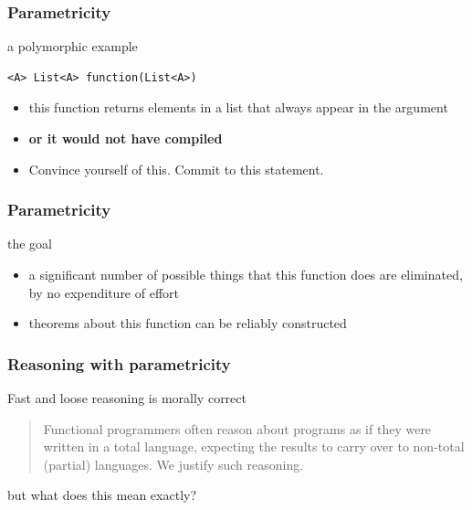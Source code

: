 \begin{frame}[fragile]
\frametitle{Parametricity}
\begin{block}{a polymorphic example}
\begin{lstlisting}
<A> List<A> function(List<A>)
\end{lstlisting}
\end{block}
\begin{itemize}
  \item<1-> this function returns elements in a list that always appear in the argument
  \item<1-> \textbf{or it would not have compiled}
  \item<2-> Convince yourself of this. Commit to this statement.
\end{itemize}
\end{frame}

\begin{frame}[fragile]
\frametitle{Parametricity}
\begin{block}{the goal}
\begin{itemize}
  \item<1-> a significant number of possible things that this function does are eliminated, by no expenditure of effort
  \item<2-> theorems about this function can be reliably constructed
\end{itemize}
\end{block}
\end{frame}

\begin{frame}[fragile]
\frametitle{Reasoning with parametricity}
\begin{block}{Fast and loose reasoning is morally correct \cite{danielsson2006fast}}
\begin{quotation}
Functional programmers often reason about programs as if
they were written in a total language, expecting the results
to carry over to non-total (partial) languages. We justify
such reasoning.
\end{quotation}
\end{block}
but what does this mean exactly?
\end{frame}


